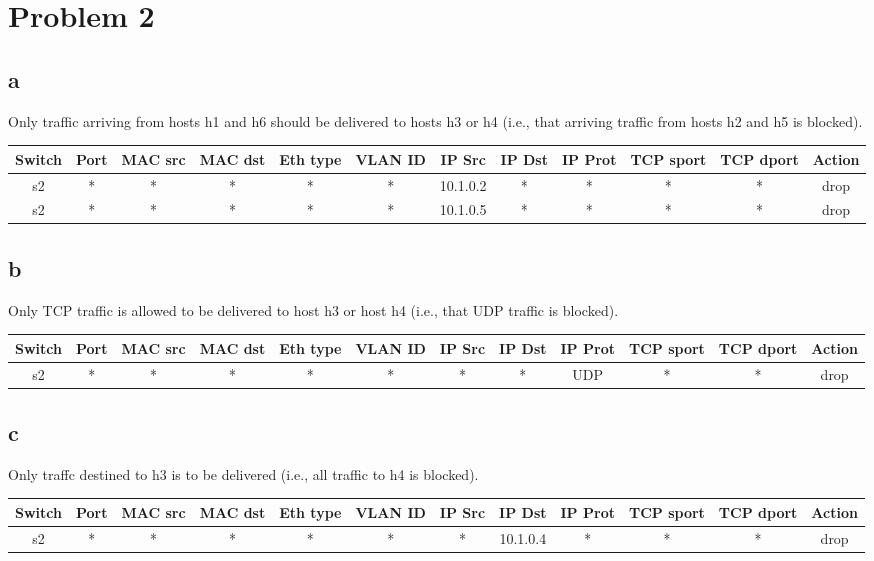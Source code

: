 \documentclass[paper=a4, fontsize=11pt]{scrartcl}
\numberwithin{equation}{section}		%
\numberwithin{figure}{section}			%
\numberwithin{table}{section}				%
\begin{document}
\section*{Problem 2}
\subsection*{a}
Only traffic arriving from hosts h1 and h6 should be delivered to hosts h3 or h4
(i.e., that arriving traffic from hosts h2 and h5 is blocked).

\begin{center}
\begin{tabular}{ | c | c | c | c | c | c | c | c | c | c | c | c | }
  \hline
Switch & Port & MAC src & MAC dst & Eth type & VLAN ID & IP Src & IP Dst & IP Prot & TCP sport & TCP dport & Action \\
  \hline
  s2 & * & * & * & * & * & 10.1.0.2 & * & * & * & * & drop \\
  \hline
  s2 & * & * & * & *  & * & 10.1.0.5 & * & * & * & * & drop \\
  \hline
\end{tabular}
\end{center}


\subsection*{b}
Only TCP traffic is allowed to be delivered to host h3 or host h4 (i.e., that
UDP traffic is blocked).

\begin{center}
\begin{tabular}{ | c | c | c | c | c | c | c | c | c | c | c | c | }
  \hline
Switch & Port & MAC src & MAC dst & Eth type & VLAN ID & IP Src & IP Dst & IP Prot & TCP sport & TCP dport & Action \\
  \hline
  s2 & * & * & * & * & * & * & * & UDP & * & * & drop \\
  \hline
\end{tabular}
\end{center}

\subsection*{c}
Only traffc destined to h3 is to be delivered (i.e., all traffic to h4 is
blocked).

\begin{center}
\begin{tabular}{ | c | c | c | c | c | c | c | c | c | c | c | c | }
  \hline
Switch & Port & MAC src & MAC dst & Eth type & VLAN ID & IP Src & IP Dst & IP Prot & TCP sport & TCP dport & Action \\
  \hline
  s2 & * & * & * & * & * & * & 10.1.0.4 & * & * & * & drop \\
  \hline
\end{tabular}
\end{center}
\end{document}
